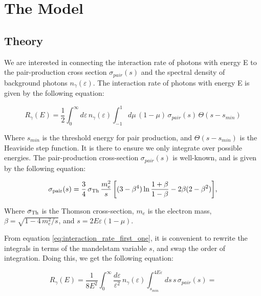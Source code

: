 \chapter{The Model}
\label{chap:The Model}

\section{Theory}

We are interested in connecting the interaction rate of photons with energy E to the pair-production cross section $\sigma_{pair}(s)$ and the spectral density of background photons $n_{\gamma}(\varepsilon)$. The interaction rate of photons with energy E is given by the following equation:

\begin{equation}
    R_{\gamma}(E) = \frac{1}{2}\int_{0}^{\infty}d\varepsilon \,n_{\gamma}(\varepsilon)\int_{-1}^{1}d\mu\,(1-\mu)\,\sigma_{pair}(s)\,\Theta(s-s_{min})
    \label{eq:interaction_rate_first_one}
\end{equation}

Where $s_{min}$ is the threshold energy for pair production, and $\Theta(s-s_{min})$ is the Heaviside step function. It is there to ensure we only integrate over possible energies. The pair-production cross-section $\sigma_{pair}(s)$ is well-known, and is given by the following equation:

\begin{equation}
    \sigma_{\rm pair}(s)=\frac{3}{4}\,\sigma_{{\rm Th}}\, \frac{m_e^2}{s}
     \left[(3-\beta^{4})\ln\frac{1+\beta}{1-\beta}-2\beta(2-\beta^{2})\right]\!,
    \label{eq:sigma-pair}
\end{equation}

Where $\sigma_{\rm Th}$ is the Thomson cross-section, $m_e$ is the electron mass, $\beta = \sqrt{1-4\,m_e^2/s}$, and $s = 2E\varepsilon(1-\mu)$.

From equation \ref{eq:interaction_rate_first_one}, it is convenient to rewrite the integrals in terms of the mandelstam variable $s$, and swap the order of integration. Doing this, we get the following equation:

\newpage

\begin{equation*}
    R_{\gamma}(E) = \frac{1}{8E^2}\int_{0}^{\infty}\frac{d\varepsilon}{\varepsilon^2}\,n_{\gamma}(\varepsilon)\int_{s_{min}}^{4E\varepsilon}ds\,s\,\sigma_{pair}(s) =
    \label{eq:interaction_rate_second_one}
\end{equation*}

